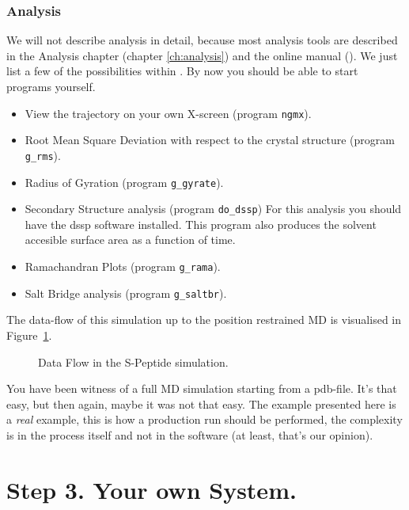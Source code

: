 \subsubsection{Analysis}
We will not describe analysis in detail, because most analysis tools
are described in the Analysis chapter (chapter
\ref{ch:analysis}) and the online manual ({\wwwpage}). We
just list a few of the possibilities within {\gromacs}. By now you should be
able to start programs yourself.

\begin{itemize}
\item View the trajectory on your own X-screen (program {\tt ngmx}).
\item Root Mean Square Deviation with respect to the crystal
	structure (program {\tt g\_rms}).
\item Radius of Gyration (program {\tt g\_gyrate}).
\item Secondary Structure analysis (program {\tt do\_dssp})
	For this analysis you should have the dssp\cite{Kabsch83}
	software installed. This program also produces
	the solvent accesible surface area as a function of time.
\item Ramachandran Plots (program {\tt g\_rama}).
\item Salt Bridge analysis (program {\tt g\_saltbr}).
\end{itemize}

The data-flow of this simulation up to
the position restrained MD is visualised in Figure~\ref{fig:spep}. 
\begin {figure}[H]
\centerline{}
\caption {Data Flow in the S-Peptide simulation.}
\label{fig:spep}
\end {figure}

You have been witness of a full MD simulation starting from a pdb-file.
It's that easy, but then again, maybe it was not that easy. The
example presented here is a {\em real} example, this is how a 
production run should be performed, the complexity is in the process 
itself and not in the software (at least, that's our opinion).

\section{Step 3. Your own System.}

